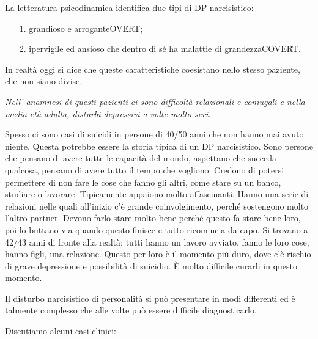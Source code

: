La letteratura psicodinamica identifica due tipi di DP narcisistico:

\begin{itemize}
\item[1.] grandioso e arroganteOVERT;
\item[2.] ipervigile ed ansioso che dentro di sé ha malattie di grandezzaCOVERT.
\end{itemize}

In realtà oggi si dice che queste caratteristiche coesistano nello
stesso paziente, che non siano divise.

\emph{\emph{Nell' anamnesi di questi pazienti ci sono difficoltà
relazionali e coniugali e nella media età-adulta, disturbi depressivi a
volte molto seri. }}

Spesso ci sono casi di suicidi in persone di 40/50 anni che non hanno
mai avuto niente. Questa potrebbe essere la storia tipica di un DP
narcisistico. Sono persone che pensano di avere tutte le capacità del
mondo, aspettano che succeda qualcosa, pensano di avere tutto il tempo
che vogliono. Credono di potersi permettere di non fare le cose che
fanno gli altri, come stare su un banco, studiare o lavorare.
Tipicamente appaiono molto affascinanti. Hanno una serie di relazioni
nelle quali all'inizio c'è grande coinvolgimento, perché sostengono
molto l'altro partner. Devono farlo stare molto bene perché questo fa
stare bene loro, poi lo buttano via quando questo finisce e tutto
ricomincia da capo. Si trovano a 42/43 anni di fronte alla realtà: tutti
hanno un lavoro avviato, fanno le loro cose, hanno figli, una relazione.
Questo per loro è il momento più duro, dove c'è rischio di grave
depressione e possibilità di suicidio. È molto difficile curarli in
questo momento.

Il disturbo narcisistico di personalità si può presentare in modi
differenti ed è talmente complesso che alle volte può essere difficile
diagnosticarlo.

Discutiamo alcuni casi clinici:

